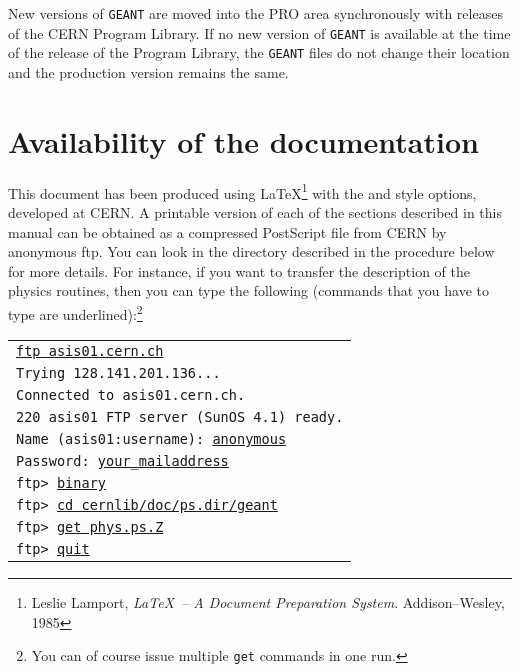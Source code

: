 New versions of {\tt GEANT} are moved into the PRO area synchronously with
releases of the CERN Program Library. If no new version of {\tt GEANT}
is available
at the time of the release of the Program Library, the {\tt GEANT} files do not
change their location and the production version remains the same.  
 
\section{Availability of the documentation}
 
This document has been produced using \LaTeX\footnote{%
Leslie Lamport, {\it \LaTeX\ -- A Document Preparation
System}. Addison--Wesley, 1985}
with the  and  style options, developed at CERN.
A printable version of each of the sections described in this manual
can be obtained as a compressed PostScript file from CERN 
by anonymous ftp. You can look in the directory described in the
procedure below for more details.
For instance, if you want to transfer the description
of the physics routines, then you can type the following
(commands that you have to type are underlined):\footnote{You can of course 
issue multiple {\tt get} commands in one run.}
 

\vspace*{3mm}
\begin{tabular}{@{\hspace{12mm}}>{\tt}l}
\underline{ftp asis01.cern.ch}\\
Trying 128.141.201.136...\\
Connected to asis01.cern.ch.\\
220 asis01 FTP server (SunOS 4.1) ready.\\
Name (asis01:username): \underline{anonymous}\\
Password: \underline{your\_{}mailaddress}\\
ftp> \underline{binary}        \\
ftp> \underline{cd cernlib/doc/ps.dir/geant}\\
ftp> \underline{get phys.ps.Z} \\
ftp> \underline{quit}          \\
\end{tabular}
